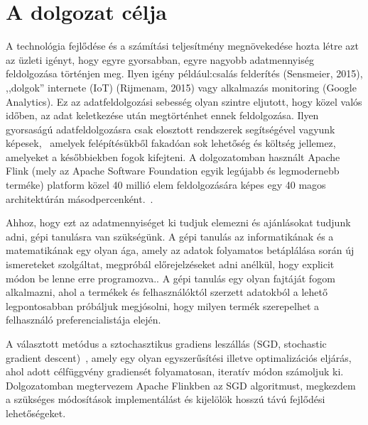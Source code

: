 \documentclass[a4paper,12pt]{article}
\begin{document}
\section{A dolgozat célja}
A technológia fejlődése és a számítási teljesítmény megnövekedése hozta létre azt az üzleti igényt, hogy egyre gyorsabban, egyre nagyobb adatmennyiség feldolgozása történjen meg. Ilyen igény például:csalás felderítés (Sensmeier, 2015), ,,dolgok'' internete (IoT) (Rijmenam, 2015) vagy alkalmazás monitoring (Google Analytics). Ez az adatfeldolgozási sebesség olyan szintre eljutott, hogy közel valós időben, az adat keletkezése után megtörténhet ennek feldolgozása. Ilyen gyorsaságú adatfeldolgozásra csak elosztott rendszerek segítségével vagyunk képesek,~\parencite{ucl} amelyek felépítésükből fakadóan sok lehetőség és költség jellemez, amelyeket a későbbiekben fogok kifejteni. A dolgozatomban használt Apache Flink (mely az Apache Software Foundation egyik legújabb és legmodernebb terméke) platform közel 40 millió elem feldolgozására képes egy 40 magos architektúrán másodpercenként.~\parencite{flinkintro}.\newline

Ahhoz, hogy ezt az adatmennyiséget ki tudjuk elemezni és ajánlásokat tudjunk adni, gépi tanulásra van szükségünk. A gépi tanulás az informatikának és a matematikának egy olyan ága, amely az adatok folyamatos betáplálása során új ismereteket szolgáltat, megpróbál előrejelzéseket adni anélkül, hogy explicit módon be lenne erre programozva.\parencite{ml}. A gépi tanulás egy olyan fajtáját fogom alkalmazni, ahol a termékek és felhasználóktól szerzett adatokból a lehető legpontosabban próbáljuk megjósolni, hogy milyen termék szerepelhet a felhasználó preferencialistája elején. 
\newline

A választott metódus a sztochasztikus gradiens leszállás (SGD, stochastic gradient descent)~\parencite{sgd}, amely egy olyan egyszerűsítési illetve optimalizációs eljárás, ahol adott célfüggvény gradiensét folyamatosan, iteratív módon számoljuk ki. Dolgozatomban megtervezem Apache Flinkben az SGD algoritmust, megkezdem a szükséges módosítások implementálást és kijelölök hosszú távú fejlődési lehetőségeket.

\newpage
\end{document}
